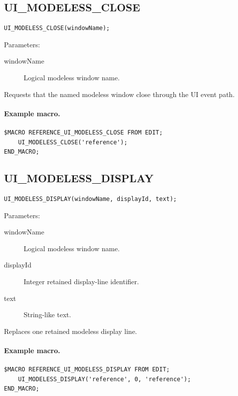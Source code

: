 \documentclass[a4paper,10pt,twoside,openany]{book}
\newenvironment{mrmacextension}{\begin{changebar}}{\end{changebar}}
\begin{document}
\begin{mrmacextension}
\label{prim:procedure-ui-modeless-close}
\subsection*{UI\_MODELESS\_CLOSE}
\begin{verbatim}
UI_MODELESS_CLOSE(windowName);
\end{verbatim}
Parameters:
\begin{description}
\item[windowName] Logical modeless window name.
\end{description}

Requests that the named modeless window close through the UI event path.

\paragraph{Example macro.}
\begin{verbatim}
$MACRO REFERENCE_UI_MODELESS_CLOSE FROM EDIT;
    UI_MODELESS_CLOSE('reference');
END_MACRO;
\end{verbatim}
\end{mrmacextension}

\begin{mrmacextension}
\label{prim:procedure-ui-modeless-display}
\subsection*{UI\_MODELESS\_DISPLAY}
\begin{verbatim}
UI_MODELESS_DISPLAY(windowName, displayId, text);
\end{verbatim}
Parameters:
\begin{description}
\item[windowName] Logical modeless window name.
\item[displayId] Integer retained display-line identifier.
\item[text] String-like text.
\end{description}

Replaces one retained modeless display line.

\paragraph{Example macro.}
\begin{verbatim}
$MACRO REFERENCE_UI_MODELESS_DISPLAY FROM EDIT;
    UI_MODELESS_DISPLAY('reference', 0, 'reference');
END_MACRO;
\end{verbatim}
\end{mrmacextension}
\end{document}
